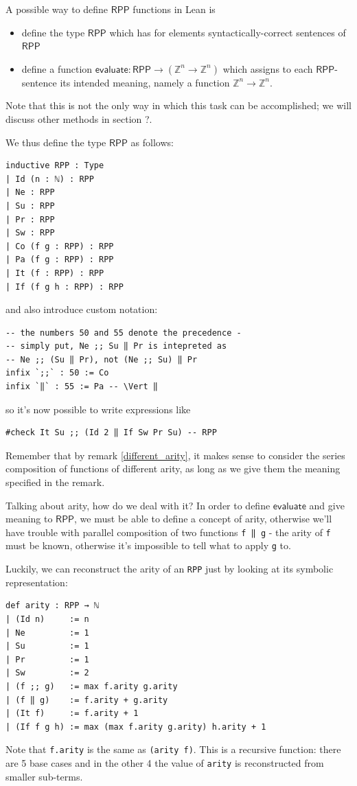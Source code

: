 \documentclass{book}
\theoremstyle{definition}
\theoremstyle{remark}
\theoremstyle{plain}
\newcommand{\ZZ}{\mathbb{Z}}
\newcommand{\RPP}{\mathsf{RPP}}
\begin{document}
A possible way to define $\RPP$ functions in Lean is
\begin{itemize}
\item define the type $\RPP$ which has for elements syntactically-correct sentences of $\RPP$
\item define a function $\mathsf{evaluate} : \RPP \to (\ZZ^n \to \ZZ^n)$ which assigns to each $\RPP$-sentence its intended meaning,
namely a function $\ZZ^n \to \ZZ^n$.
\end{itemize}
Note that this is not the only way in which this task can be accomplished;
we will discuss other methods in section ?.

We thus define the type $\RPP$ as follows:
\begin{lstlisting}
inductive RPP : Type
| Id (n : ℕ) : RPP
| Ne : RPP
| Su : RPP
| Pr : RPP
| Sw : RPP
| Co (f g : RPP) : RPP
| Pa (f g : RPP) : RPP
| It (f : RPP) : RPP
| If (f g h : RPP) : RPP
\end{lstlisting}
and also introduce custom notation:
\begin{lstlisting}
-- the numbers 50 and 55 denote the precedence -
-- simply put, Ne ;; Su ‖ Pr is intepreted as
-- Ne ;; (Su ‖ Pr), not (Ne ;; Su) ‖ Pr
infix `;;` : 50 := Co
infix `‖` : 55 := Pa -- \Vert ‖
\end{lstlisting}
so it's now possible to write expressions like
\begin{lstlisting}
#check It Su ;; (Id 2 ‖ If Sw Pr Su) -- RPP
\end{lstlisting}
Remember that by remark \ref{different_arity}, it makes sense to consider the series composition of functions of different arity,
as long as we give them the meaning specified in the remark.

Talking about arity, how do we deal with it?
In order to define $\mathsf{evaluate}$ and give meaning to $\RPP$,
we must be able to define a concept of arity,
otherwise we'll have trouble with parallel composition of two functions \lstinline{f ‖ g} -
the arity of \lstinline{f} must be known,
otherwise it's impossible to tell what to apply \lstinline{g} to.

Luckily, we can reconstruct the arity of an \lstinline{RPP} just by looking at its symbolic representation:
\begin{lstlisting}
def arity : RPP → ℕ
| (Id n)     := n
| Ne         := 1
| Su         := 1
| Pr         := 1
| Sw         := 2
| (f ;; g)   := max f.arity g.arity
| (f ‖ g)    := f.arity + g.arity
| (It f)     := f.arity + 1
| (If f g h) := max (max f.arity g.arity) h.arity + 1
\end{lstlisting}
Note that \lstinline{f.arity} is the same as \lstinline{(arity f)}.
This is a recursive function:
there are 5 base cases and in the other 4 the value of \lstinline{arity} is reconstructed from smaller sub-terms.
\end{document}
